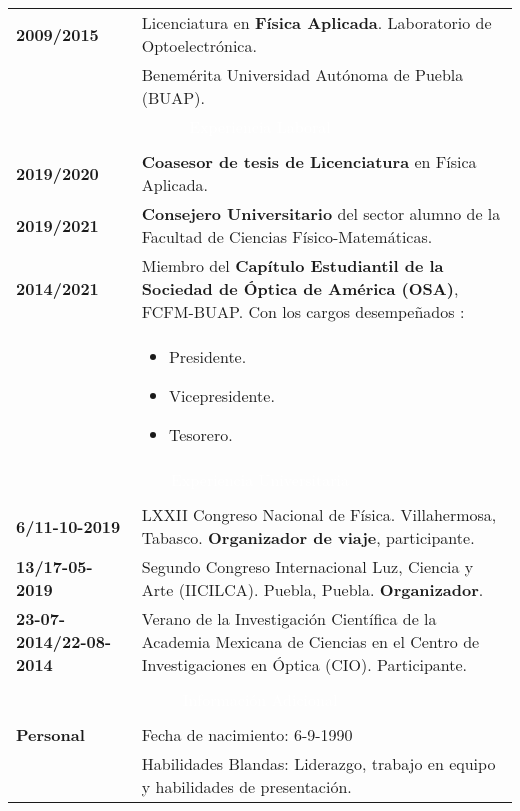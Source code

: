 \documentclass[twoside,letter,openright,10pt]{report}
\begin{document}
\begin{table}[hbt!]
\begin{tabular}{p{40mm}p{140mm}}
\\
\textbf{2009/2015} & Licenciatura en \textbf{Física Aplicada}. Laboratorio de Optoelectrónica. 
\\
& Benemérita Universidad Autónoma de Puebla (BUAP). 
\\
\multicolumn{2}{c}{\cellcolor{black} \textcolor{white}{Experiencia Laboral}}
\\
\\
\textbf{2019/2020} & \textbf{Coasesor de tesis de Licenciatura}  en Física Aplicada.
\\
\textbf{2019/2021} & \textbf{Consejero Universitario} del sector alumno de la Facultad de Ciencias Físico-Matemáticas.
\\
\textbf{2014/2021} & Miembro del \textbf{Capítulo Estudiantil de la Sociedad de Óptica de América (OSA)}, FCFM-BUAP. Con los cargos desempeñados :\\
& \vspace{-2mm} \begin{itemize}[noitemsep,nolistsep]
\item Presidente.
\item Vicepresidente.
\item Tesorero.
\vspace{-4mm}
\end{itemize}
\\
\multicolumn{2}{c}{\cellcolor{black} \textcolor{white}{Experiencia Universitaria}}
\\
\\
\textbf{6/11-10-2019} &LXXII Congreso Nacional de Física. Villahermosa, Tabasco. \textbf{Organizador de viaje}, participante.
\\
\textbf{13/17-05-2019} &Segundo Congreso Internacional Luz, Ciencia y Arte (IICILCA). Puebla, Puebla. \textbf{Organizador}.
\\
\textbf{23-07-2014/22-08-2014} & Verano de la Investigación Científica de la Academia Mexicana de Ciencias en el Centro de Investigaciones en Óptica (CIO). Participante.
\\
\\
\multicolumn{2}{c}{\cellcolor{black} \textcolor{white}{Información Adicional}}
\\
\\
\textbf{Personal} &  Fecha de nacimiento: 6-9-1990
\\
& Habilidades Blandas: Liderazgo, trabajo en equipo y habilidades de presentación.

\end{tabular}
\end{table}
\end{document}
